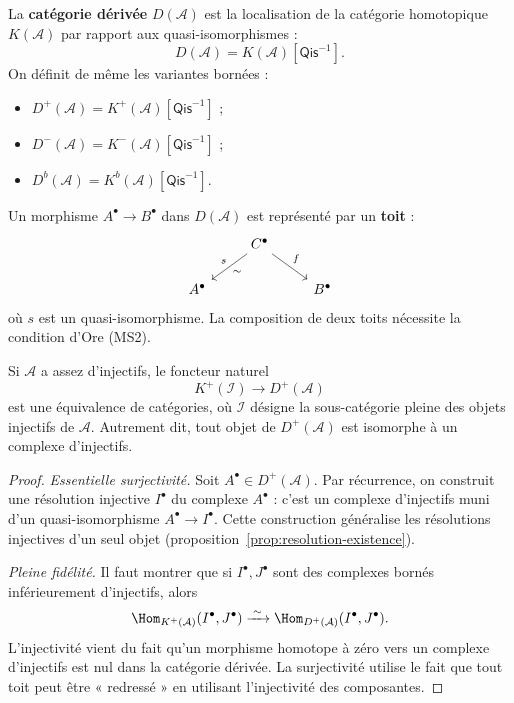 \begin{definition}\label{def:derived-category}
La \textbf{catégorie dérivée} $D(\mathcal{A})$ est la localisation de la
catégorie homotopique $K(\mathcal{A})$ par rapport aux quasi-isomorphismes :
\[
  D(\mathcal{A}) = K(\mathcal{A})[\mathsf{Qis}^{-1}].
\]
On définit de même les variantes bornées :
\begin{itemize}
\item $D^+(\mathcal{A}) = K^+(\mathcal{A})[\mathsf{Qis}^{-1}]$ ;
\item $D^-(\mathcal{A}) = K^-(\mathcal{A})[\mathsf{Qis}^{-1}]$ ;
\item $D^b(\mathcal{A}) = K^b(\mathcal{A})[\mathsf{Qis}^{-1}]$.
\end{itemize}
\end{definition}

\begin{remarque}\label{rem:derived-category-morphisms}
Un morphisme $A^\bullet \to B^\bullet$ dans $D(\mathcal{A})$ est
représenté par un \textbf{toit} :
\[
\begin{tikzcd}
& C^\bullet \arrow[dl, "s"', "\sim"] \arrow[dr, "f"] \\
A^\bullet & & B^\bullet
\end{tikzcd}
\]
où $s$ est un quasi-isomorphisme. La composition de deux toits
nécessite la condition d'Ore (MS2).
\end{remarque}

\begin{theoreme}\label{thm:derived-via-injectives}
Si $\mathcal{A}$ a assez d'injectifs, le foncteur naturel
\[
  K^+(\mathcal{I}) \longrightarrow D^+(\mathcal{A})
\]
est une équivalence de catégories, où $\mathcal{I}$ désigne la
sous-catégorie pleine des objets injectifs de $\mathcal{A}$.
Autrement dit, tout objet de $D^+(\mathcal{A})$ est isomorphe à
un complexe d'injectifs.
\end{theoreme}

\begin{proof}
\emph{Essentielle surjectivité.} Soit $A^\bullet \in D^+(\mathcal{A})$.
Par récurrence, on construit une résolution injective
$I^\bullet$ du complexe $A^\bullet$ : c'est un complexe d'injectifs
muni d'un quasi-isomorphisme $A^\bullet \to I^\bullet$. Cette
construction généralise les résolutions injectives d'un seul objet
(proposition~\ref{prop:resolution-existence}).

\emph{Pleine fidélité.} Il faut montrer que si $I^\bullet, J^\bullet$
sont des complexes bornés inférieurement d'injectifs, alors
\[
  \Hom_{K^+(\mathcal{A})}(I^\bullet, J^\bullet)
  \xrightarrow{\;\sim\;} \Hom_{D^+(\mathcal{A})}(I^\bullet, J^\bullet).
\]
L'injectivité vient du fait qu'un morphisme homotope à zéro vers un
complexe d'injectifs est nul dans la catégorie dérivée. La surjectivité
utilise le fait que tout toit peut être « redressé » en utilisant
l'injectivité des composantes.
\end{proof}



